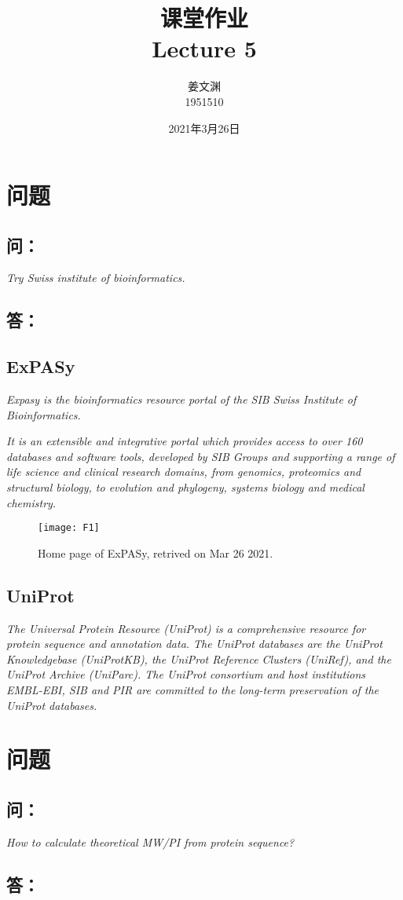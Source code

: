 \documentclass[cn,black,12pt,normal]{elegantnote}
\title{课堂作业\\Lecture 5}
\author{姜文渊\\1951510}
\institute{School of Life Science, Tongji University}
\date{2021年3月26日}
\newcommand{\upcite}[1]{\textsuperscript{\textsuperscript{\cite{#1}}}}
\begin{document}
\maketitle


\section{问题}
\subsection*{问：}

\textit{Try Swiss institute of bioinformatics.}

\subsection*{答：}

\subsection{ExPASy}
\textit{Expasy is the bioinformatics resource portal of the SIB Swiss Institute of Bioinformatics.}

\textit{It is an extensible and integrative portal which provides access to over 160 databases and software tools, developed by SIB Groups and supporting a range of life science and clinical research domains, from genomics, proteomics and structural biology, to evolution and phylogeny, systems biology and medical chemistry.}
\upcite{gasteiger2003expasy}

\begin{figure}[H]
    \centering
    \texttt{[image: F1]}
    \caption{Home page of ExPASy, retrived on Mar 26 2021.}
    \label{F-01}
\end{figure}

\subsection{UniProt}
\textit{The Universal Protein Resource (UniProt) is a comprehensive resource for protein sequence and annotation data. The UniProt databases are the UniProt Knowledgebase (UniProtKB), the UniProt Reference Clusters (UniRef), and the UniProt Archive (UniParc). The UniProt consortium and host institutions EMBL-EBI, SIB and PIR are committed to the long-term preservation of the UniProt databases.}
\upcite{uniprot2019uniprot}


\section{问题}
\subsection*{问：}

\textit{How to calculate theoretical MW/PI from protein sequence?}

\subsection*{答：}

{}
\end{document}
